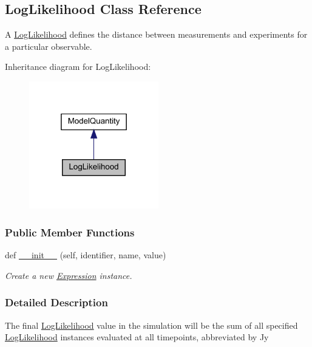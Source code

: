 \hypertarget{classamici_1_1ode__export_1_1_log_likelihood}{}\subsection{Log\+Likelihood Class Reference}
\label{classamici_1_1ode__export_1_1_log_likelihood}


A \mbox{\hyperlink{classamici_1_1ode__export_1_1_log_likelihood}{Log\+Likelihood}} defines the distance between measurements and experiments for a particular observable.  




Inheritance diagram for Log\+Likelihood\+:
\nopagebreak
\begin{figure}[H]
\begin{center}
\leavevmode
\includegraphics[width=160pt]{classamici_1_1ode__export_1_1_log_likelihood__inherit__graph}
\end{center}
\end{figure}
\subsubsection*{Public Member Functions}
\begin{DoxyCompactItemize}
\item 
def \mbox{\hyperlink{classamici_1_1ode__export_1_1_log_likelihood_a258843a3afab00b576ccf386e8673a64}{\+\_\+\+\_\+init\+\_\+\+\_\+}} (self, identifier, name, value)
\begin{DoxyCompactList}\small\item\em Create a new \mbox{\hyperlink{classamici_1_1ode__export_1_1_expression}{Expression}} instance. \end{DoxyCompactList}\end{DoxyCompactItemize}


\subsubsection{Detailed Description}
The final \mbox{\hyperlink{classamici_1_1ode__export_1_1_log_likelihood}{Log\+Likelihood}} value in the simulation will be the sum of all specified \mbox{\hyperlink{classamici_1_1ode__export_1_1_log_likelihood}{Log\+Likelihood}} instances evaluated at all timepoints, abbreviated by {\ttfamily Jy} 

